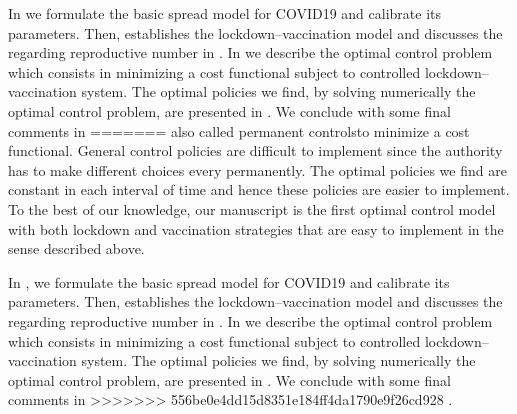     In  we formulate the basic spread model for
COVID19 and calibrate its parameters. Then, 
establishes the lockdown--vaccination model and discusses the regarding
reproductive number in . In
 we describe the optimal control problem which
consists in minimizing a cost functional subject to controlled
lockdown--vaccination system. The optimal policies we find, by solving
numerically the optimal control problem, are presented in
. We conclude with some final comments in
=======
\textemdash also called permanent controls\textemdash to minimize a cost 
functional. General control policies are difficult to implement since the 
authority has to make different choices every permanently. The optimal policies 
we find are constant in each interval of time and hence these policies are 
easier to implement. To the best of our knowledge, our manuscript is the first 
optimal control model with both lockdown and vaccination strategies that are 
easy to implement in the sense described above. 


In , we formulate the
basic spread model for COVID19 and calibrate its parameters. Then,
 establishes the lockdown--vaccination model and
discusses the regarding reproductive number in
. 
In  we describe the optimal control problem 
which consists in minimizing a cost functional subject to controlled 
lockdown--vaccination system. The optimal policies we find, by solving 
numerically the optimal control problem, are presented in 
. We conclude with some final comments in 
>>>>>>> 556be0e4dd15d8351e184ff4da1790e9f26cd928
.